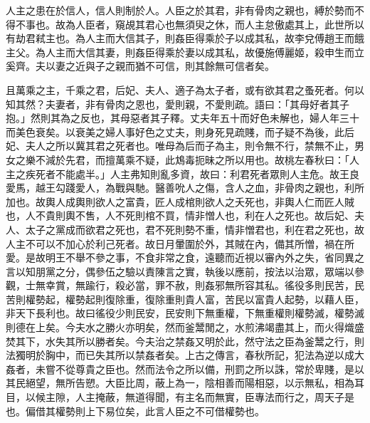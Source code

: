 
\begin{pinyinscope}
人主之患在於信人，信人則制於人。人臣之於其君，非有骨肉之親也，縛於勢而不得不事也。故為人臣者，窺覘其君心也無須臾之休，而人主怠傲處其上，此世所以有劫君弒主也。為人主而大信其子，則姦臣得乘於子以成其私，故李兌傅趙王而餓主父。為人主而大信其妻，則姦臣得乘於妻以成其私，故優施傅麗姬，殺申生而立奚齊。夫以妻之近與子之親而猶不可信，則其餘無可信者矣。

且萬乘之主，千乘之君，后妃、夫人、適子為太子者，或有欲其君之蚤死者。何以知其然？夫妻者，非有骨肉之恩也，愛則親，不愛則疏。語曰：「其母好者其子抱。」然則其為之反也，其母惡者其子釋。丈夫年五十而好色未解也，婦人年三十而美色衰矣。以衰美之婦人事好色之丈夫，則身死見疏賤，而子疑不為後，此后妃、夫人之所以冀其君之死者也。唯母為后而子為主，則令無不行，禁無不止，男女之樂不減於先君，而擅萬乘不疑，此鴆毒扼昧之所以用也。故桃左春秋曰：「人主之疾死者不能處半。」人主弗知則亂多資，故曰：利君死者眾則人主危。故王良愛馬，越王勾踐愛人，為戰與馳。醫善吮人之傷，含人之血，非骨肉之親也，利所加也。故輿人成輿則欲人之富貴，匠人成棺則欲人之夭死也，非輿人仁而匠人賊也，人不貴則輿不售，人不死則棺不買，情非憎人也，利在人之死也。故后妃、夫人、太子之黨成而欲君之死也，君不死則勢不重，情非憎君也，利在君之死也，故人主不可以不加心於利己死者。故日月暈圍於外，其賊在內，備其所憎，禍在所愛。是故明王不舉不參之事，不食非常之食，遠聽而近視以審內外之失，省同異之言以知朋黨之分，偶參伍之驗以責陳言之實，執後以應前，按法以治眾，眾端以參觀，士無幸賞，無踰行，殺必當，罪不赦，則姦邪無所容其私。徭役多則民苦，民苦則權勢起，權勢起則復除重，復除重則貴人富，苦民以富貴人起勢，以藉人臣，非天下長利也。故曰徭役少則民安，民安則下無重權，下無重權則權勢滅，權勢滅則德在上矣。今夫水之勝火亦明矣，然而釜鬵閒之，水煎沸竭盡其上，而火得熾盛焚其下，水失其所以勝者矣。今夫治之禁姦又明於此，然守法之臣為釜鬵之行，則法獨明於胸中，而已失其所以禁姦者矣。上古之傳言，春秋所記，犯法為逆以成大姦者，未嘗不從尊貴之臣也。然而法令之所以備，刑罰之所以誅，常於卑賤，是以其民絕望，無所告愬。大臣比周，蔽上為一，陰相善而陽相惡，以示無私，相為耳目，以候主隙，人主掩蔽，無道得聞，有主名而無實，臣專法而行之，周天子是也。偏借其權勢則上下易位矣，此言人臣之不可借權勢也。


\end{pinyinscope}